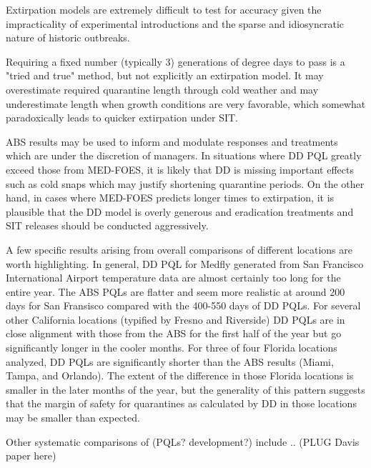 \documentclass[10pt,a4paper,twocolumn]{article}
\begin{document}

Extirpation models are extremely difficult to test for accuracy given 
the impracticality of experimental introductions and 
the sparse and idiosyncratic nature of historic outbreaks.

Requiring a fixed number (typically 3) generations of degree days to pass is 
a "tried and true" method, but not explicitly an extirpation model.
It may overestimate required quarantine length through cold weather\cite{??}
and may underestimate length when growth conditions are very favorable, 
which somewhat paradoxically leads to quicker extirpation under SIT.

ABS results may be used to inform and modulate responses and treatments which are under
the discretion of managers.
In situations where DD PQL greatly exceed those from MED-FOES, it is likely
that DD is missing important effects such as cold snaps which may justify
shortening quarantine periods.
On the other hand, in cases where MED-FOES predicts longer times to extirpation, it
is plausible that the DD model is overly generous and 
eradication treatments and SIT releases should be conducted aggressively.


A few specific results arising from overall comparisons of different locations are worth highlighting. 
In general, DD PQL for Medfly 
generated from San Francisco International Airport temperature data
 are almost certainly too long for the entire year.
The ABS PQLs are flatter and seem more realistic at around 200 days for San
Fransisco compared with the 400-550 days of DD PQLs. 
For several other California locations (typified by Fresno and 
Riverside) DD PQLs are in close alignment with those from the ABS 
for the first half of the year 
but go significantly longer in the cooler months. 
For three of four Florida locations analyzed, 
DD PQLs are significantly shorter than the ABS results
 (Miami, Tampa, and Orlando).
The extent of the difference in those Florida locations is smaller in the later months of the year,
but the generality of this pattern suggests that the margin of safety for quarantines as 
calculated by DD in those locations may be smaller than expected. 

Other systematic comparisons of (PQLs? development?) include .. (PLUG Davis paper here) 
\end{document}
